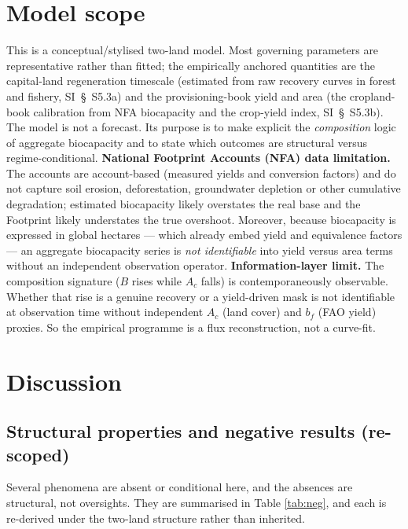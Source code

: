 \documentclass[11pt]{article}
\begin{document}
\section{Model scope}

This is a conceptual/stylised two-land model. Most governing parameters are representative rather than fitted; the empirically anchored quantities are the capital-land regeneration timescale (estimated from raw recovery curves in forest and fishery, SI~\S\ S5.3a) and the provisioning-book yield and area (the cropland-book calibration from NFA biocapacity and the crop-yield index, SI~\S\ S5.3b). The model is not a forecast. Its purpose is to make explicit the \emph{composition} logic of aggregate biocapacity and to state which outcomes are structural versus regime-conditional. \textbf{National Footprint Accounts (NFA) data limitation.} The accounts are account-based (measured yields and conversion factors) and do not capture soil erosion, deforestation, groundwater depletion or other cumulative degradation; estimated biocapacity likely overstates the real base and the Footprint likely understates the true overshoot. Moreover, because biocapacity is expressed in global hectares --- which already embed yield and equivalence factors --- an aggregate biocapacity series is \emph{not identifiable} into yield versus area terms without an independent observation operator. \textbf{Information-layer limit.} The composition signature ($B$ rises while $A_c$ falls) is contemporaneously observable. Whether that rise is a genuine recovery or a yield-driven mask is not identifiable at observation time without independent $A_c$ (land cover) and $b_f$ (FAO yield) proxies. So the empirical programme is a flux reconstruction, not a curve-fit.

\section{Discussion}

\subsection{Structural properties and negative results (re-scoped)}

Several phenomena are absent or conditional here, and the absences are structural, not oversights. They are
summarised in Table \ref{tab:neg}, and each is re-derived under the two-land structure rather than inherited.
\end{document}

